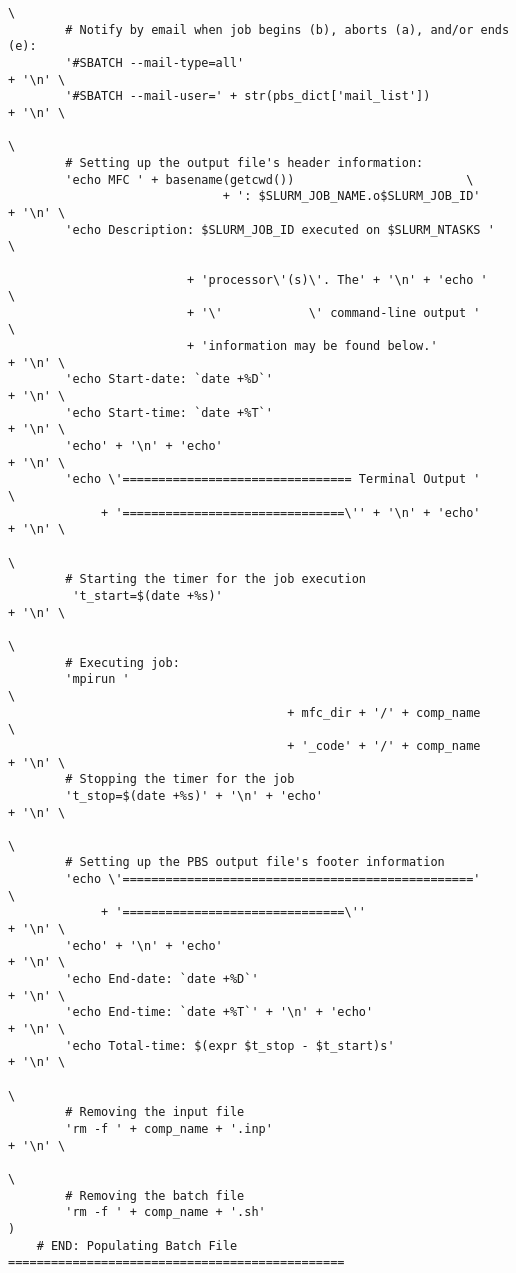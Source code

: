 \documentclass[11pt]{article}
\begin{document}
\begin{lstlisting}[style=BashInputStyle]
                                                                               \
        # Notify by email when job begins (b), aborts (a), and/or ends (e):
        '#SBATCH --mail-type=all'                                       + '\n' \
        '#SBATCH --mail-user=' + str(pbs_dict['mail_list'])             + '\n' \
                                                                               \
        # Setting up the output file's header information:
        'echo MFC ' + basename(getcwd())                        \
                              + ': $SLURM_JOB_NAME.o$SLURM_JOB_ID'      + '\n' \
        'echo Description: $SLURM_JOB_ID executed on $SLURM_NTASKS '           \

                         + 'processor\'(s)\'. The' + '\n' + 'echo '            \
                         + '\'            \' command-line output '             \
                         + 'information may be found below.'            + '\n' \
        'echo Start-date: `date +%D`'                                   + '\n' \
        'echo Start-time: `date +%T`'                                   + '\n' \
        'echo' + '\n' + 'echo'                                          + '\n' \
        'echo \'================================ Terminal Output '             \
             + '===============================\'' + '\n' + 'echo'      + '\n' \
                                                                               \
        # Starting the timer for the job execution
         't_start=$(date +%s)'                                          + '\n' \
                                                                               \
        # Executing job:
        'mpirun '                                                               \
                                       + mfc_dir + '/' + comp_name             \
                                       + '_code' + '/' + comp_name      + '\n' \
        # Stopping the timer for the job
        't_stop=$(date +%s)' + '\n' + 'echo'                            + '\n' \
                                                                               \
        # Setting up the PBS output file's footer information
        'echo \'================================================='             \
             + '===============================\''                      + '\n' \
        'echo' + '\n' + 'echo'                                          + '\n' \
        'echo End-date: `date +%D`'                                     + '\n' \
        'echo End-time: `date +%T`' + '\n' + 'echo'                     + '\n' \
        'echo Total-time: $(expr $t_stop - $t_start)s'                  + '\n' \
                                                                               \
        # Removing the input file
        'rm -f ' + comp_name + '.inp'                                   + '\n' \
                                                                               \
        # Removing the batch file
        'rm -f ' + comp_name + '.sh'                                           )
    # END: Populating Batch File ===============================================
    

\end{lstlisting}
\end{document}
